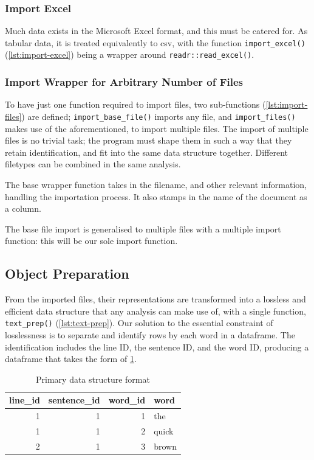 \message{ !name(jason-cairns-dissertation.tex)}\documentclass[11pt, a4paper, titlepage]{report}
\begin{document}
\subsubsection{Import Excel}

Much data exists in the Microsoft Excel format, and this must be
catered for. As tabular data, it is treated equivalently to csv, with
the function \texttt{import_excel()} (\cref{lst:import-excel})
being a wrapper around \texttt{readr::read_excel()}.

\subsubsection{Import Wrapper for Arbitrary Number of Files}

To have just one function required to import files, two sub-functions
(\cref{lst:import-files}) are defined;
\texttt{import_base_file()} imports any file, and
\texttt{import_files()} makes use of the aforementioned, to
import multiple files. The import of multiple files is no trivial
task; the program must shape them in such a way that they retain
identification, and fit into the same data structure together.
Different filetypes can be combined in the same analysis.

The base wrapper function takes in the filename, and other relevant
information, handling the importation process. It also stamps in the
name of the document as a column.

The base file import is generalised to multiple files with a multiple
import function: this will be our sole import function.

\subsection{Object Preparation}

From the imported files, their representations are transformed into a
lossless and efficient data structure that any analysis can make use
of, with a single function, \texttt{text_prep()}
(\cref{lst:text-prep}). Our solution to the essential constraint of
losslessness is to separate and identify rows by each word in a
dataframe. The identification includes the line ID, the sentence ID,
and the word ID, producing a dataframe that takes the form of
\cref{tab:data-base}.

\begin{table}[h]
  \centering
  
  \begin{tabular}{rrrl}
    line\_id & sentence\_id & word\_id & word\\
    \toprule
    1 & 1 & 1 & the\\
    1 & 1 & 2 & quick\\
    2 & 1 & 3 & brown\\
  \end{tabular}  
  \caption{Primary data structure format}\label{tab:data-base}
\end{table}
\end{document}
